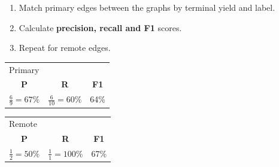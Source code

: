 \documentclass[t,xcolor={svgnames,table}]{beamer}
\begin{document}
\begin{frame}
\begin{enumerate}
  \item Match primary edges between the graphs by terminal yield and label.
  \item Calculate \textbf{precision, recall and F1} scores.
  \item Repeat for remote edges.
\end{enumerate}

\pause
\vfill
\begin{adjustbox}{center}
    \begin{tabular}{c|c|c}
        \multicolumn{3}{l}{Primary} \\
        \textbf{P} & \textbf{R} & \textbf{F1} \\ \hline
        $\frac69=67\%$ & $\frac6{10}=60\%$ & 64\%
    \end{tabular}
    \hspace{1cm}
    \begin{tabular}{c|c|c}
        \multicolumn{3}{l}{Remote} \\
        \textbf{P} & \textbf{R} & \textbf{F1} \\ \hline
        $\frac12=50\%$ & $\frac11=100\%$ & 67\%
    \end{tabular}
\end{adjustbox}
\end{frame}
\end{document}
